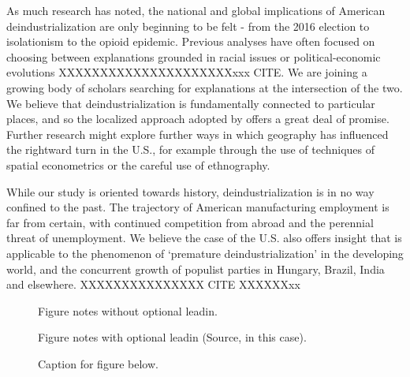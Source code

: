 \documentclass[]{AEA}
\begin{document}
As much research has noted, the national and global implications of
American deindustrialization are only beginning to be felt - from the
2016 election to isolationism to the opioid epidemic. Previous analyses
have often focused on choosing between explanations grounded in racial
issues or political-economic evolutions XXXXXXXXXXXXXXXXXXXXXxxx CITE.
We are joining a growing body of scholars searching for explanations at
the intersection of the two. We believe that deindustrialization is
fundamentally connected to particular places, and so the localized
approach adopted by \cite{BW21} offers a great deal of promise. Further
research might explore further ways in which geography has influenced
the rightward turn in the U.S., for example through the use of
techniques of spatial econometrics or the careful use of ethnography.

While our study is oriented towards history, deindustrialization is in
no way confined to the past. The trajectory of American manufacturing
employment is far from certain, with continued competition from abroad
and the perennial threat of unemployment. We believe the case of the
U.S. also offers insight that is applicable to the phenomenon of
`premature deindustrialization' in the developing world, and the
concurrent growth of populist parties in Hungary, Brazil, India and
elsewhere. XXXXXXXXXXXXXXX CITE XXXXXXxx

\begin{figure}

\caption{Caption for figure below.}
\begin{figurenotes}
Figure notes without optional leadin.
\end{figurenotes}
\begin{figurenotes}[Source]
Figure notes with optional leadin (Source, in this case).
\end{figurenotes}
\end{figure}

\nocite{stargazer}



\end{document}
